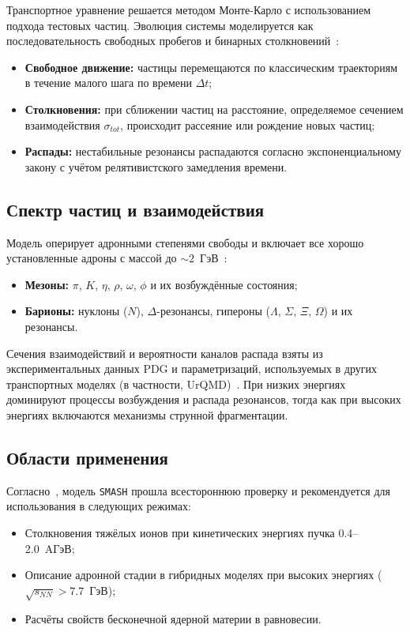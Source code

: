 \documentclass{extarticle}
\begin{document}
        Транспортное уравнение решается методом Монте-Карло 
        с использованием подхода тестовых частиц. 
        Эволюция системы моделируется как последовательность 
        свободных пробегов и бинарных столкновений~\cite{Weil:2016zrk}:
        \begin{itemize}
            \item \textbf{Свободное движение:} 
                частицы перемещаются по классическим траекториям 
                в течение малого шага по времени $\Delta t$;
            \item \textbf{Столкновения:} 
                при сближении частиц на расстояние, 
                определяемое сечением взаимодействия $\sigma_{tot}$, 
                происходит рассеяние или рождение новых частиц;
            \item \textbf{Распады:} 
                нестабильные резонансы распадаются согласно 
                экспоненциальному закону с учётом релятивистского замедления времени.
        \end{itemize}

    \subsection{Спектр частиц и взаимодействия}
        Модель оперирует адронными степенями свободы и включает 
        все хорошо установленные адроны с массой до $\sim 2$~ГэВ~\cite{Weil:2016zrk}:
        \begin{itemize}
            \item \textbf{Мезоны:} 
                $\pi$, $K$, $\eta$, $\rho$, $\omega$, $\phi$ и их возбуждённые состояния;
            \item \textbf{Барионы:} 
                нуклоны ($N$), $\Delta$-резонансы, гипероны ($\Lambda$, $\Sigma$, $\Xi$, $\Omega$) и их резонансы.
        \end{itemize}

        Сечения взаимодействий и вероятности каналов распада взяты из экспериментальных данных PDG 
        и параметризаций, используемых в других транспортных моделях (в частности, UrQMD)~\cite{Weil:2016zrk}. 
        При низких энергиях доминируют процессы возбуждения и распада резонансов, 
        тогда как при высоких энергиях включаются механизмы струнной фрагментации.

    \subsection{Области применения}
        Согласно~\cite{Weil:2016zrk}, модель \texttt{SMASH} 
        прошла всестороннюю проверку и рекомендуется для использования в следующих режимах:
        \begin{itemize}
            \item Столкновения тяжёлых ионов при кинетических энергиях пучка 0.4--2.0~AГэВ;
            \item Описание адронной стадии в гибридных моделях при высоких энергиях ($\sqrt{s_{NN}} > 7.7$~ГэВ);
            \item Расчёты свойств бесконечной ядерной материи в равновесии.
        \end{itemize}
\end{document}

